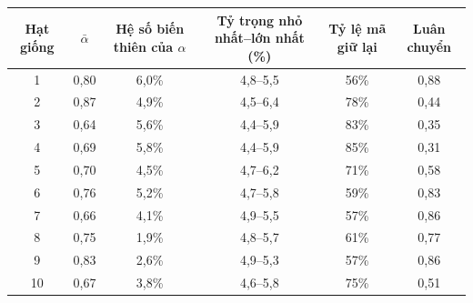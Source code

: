 \begin{tabular}{@{}cccccc@{}}
\toprule
Hạt giống & $\bar\alpha$ & Hệ số biến thiên của $\alpha$ & Tỷ trọng nhỏ nhất--lớn nhất (\%) & Tỷ lệ mã giữ lại & Luân chuyển \\
\midrule
1 & 0{,}80 & 6{,}0\% & 4{,}8--5{,}5 & 56\% & 0{,}88 \\
2 & 0{,}87 & 4{,}9\% & 4{,}5--6{,}4 & 78\% & 0{,}44 \\
3 & 0{,}64 & 5{,}6\% & 4{,}4--5{,}9 & 83\% & 0{,}35 \\
4 & 0{,}69 & 5{,}8\% & 4{,}4--5{,}9 & 85\% & 0{,}31 \\
5 & 0{,}70 & 4{,}5\% & 4{,}7--6{,}2 & 71\% & 0{,}58 \\
6 & 0{,}76 & 5{,}2\% & 4{,}7--5{,}8 & 59\% & 0{,}83 \\
7 & 0{,}66 & 4{,}1\% & 4{,}9--5{,}5 & 57\% & 0{,}86 \\
8 & 0{,}75 & 1{,}9\% & 4{,}8--5{,}7 & 61\% & 0{,}77 \\
9 & 0{,}83 & 2{,}6\% & 4{,}9--5{,}3 & 57\% & 0{,}86 \\
10 & 0{,}67 & 3{,}8\% & 4{,}6--5{,}8 & 75\% & 0{,}51 \\
\bottomrule
\end{tabular}
